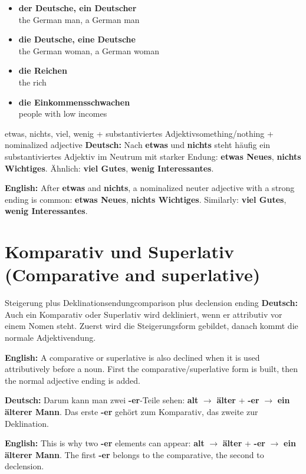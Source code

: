 \documentclass[a4paper,11pt]{article}
\newcommand{\GermanText}[1]{\textbf{Deutsch: }#1\par}
\newcommand{\EnglishText}[1]{{\small\color{SoftGray}\textbf{English: }#1\par}}
\newcommand{\ExampleItem}[2]{\item \textbf{#1}\\{\small\color{SoftGray}#2}}
\begin{document}
\begin{exbox}
\begin{itemize}
\ExampleItem{der Deutsche, ein Deutscher}{the German man, a German man}
\ExampleItem{die Deutsche, eine Deutsche}{the German woman, a German woman}
\ExampleItem{die Reichen}{the rich}
\ExampleItem{die Einkommensschwachen}{people with low incomes}
\end{itemize}
\end{exbox}

\begin{grammarentry}{etwas, nichts, viel, wenig + substantiviertes Adjektiv}{something/nothing + nominalized adjective}
\GermanText{Nach \textbf{etwas} und \textbf{nichts} steht häufig ein substantiviertes Adjektiv im Neutrum mit starker Endung: \textbf{etwas Neues}, \textbf{nichts Wichtiges}. Ähnlich: \textbf{viel Gutes}, \textbf{wenig Interessantes}.}
\EnglishText{After \textbf{etwas} and \textbf{nichts}, a nominalized neuter adjective with a strong ending is common: \textbf{etwas Neues}, \textbf{nichts Wichtiges}. Similarly: \textbf{viel Gutes}, \textbf{wenig Interessantes}.}
\end{grammarentry}

\section{Komparativ und Superlativ \textnormal{(Comparative and superlative)}}

\begin{grammarentry}{Steigerung plus Deklinationsendung}{comparison plus declension ending}
\GermanText{Auch ein Komparativ oder Superlativ wird dekliniert, wenn er attributiv vor einem Nomen steht. Zuerst wird die Steigerungsform gebildet, danach kommt die normale Adjektivendung.}
\EnglishText{A comparative or superlative is also declined when it is used attributively before a noun. First the comparative/superlative form is built, then the normal adjective ending is added.}

\GermanText{Darum kann man zwei \textbf{-er}-Teile sehen: \textbf{alt} $\rightarrow$ \textbf{älter} + \textbf{-er} $\rightarrow$ \textbf{ein älterer Mann}. Das erste \textbf{-er} gehört zum Komparativ, das zweite zur Deklination.}
\EnglishText{This is why two \textbf{-er} elements can appear: \textbf{alt} $\rightarrow$ \textbf{älter} + \textbf{-er} $\rightarrow$ \textbf{ein älterer Mann}. The first \textbf{-er} belongs to the comparative, the second to declension.}
\end{grammarentry}
\end{document}
